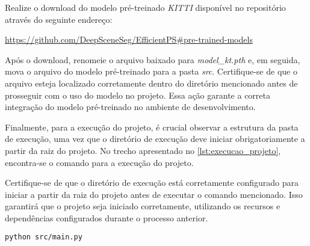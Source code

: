 Realize o download do modelo pré-treinado \emph{KITTI} disponível no repositório através do seguinte endereço:

\url{https://github.com/DeepSceneSeg/EfficientPS#pre-trained-models}

Após o download, renomeie o arquivo baixado para \emph{model\_kt.pth} e, em seguida, mova o arquivo do modelo pré-treinado para a pasta \emph{src}. Certifique-se de que o arquivo esteja localizado corretamente dentro do diretório mencionado antes de prosseguir com o uso do modelo no projeto. Essa ação garante a correta integração do modelo pré-treinado no ambiente de desenvolvimento.

Finalmente, para a execução do projeto, é crucial observar a estrutura da pasta de execução, uma vez que o diretório de execução deve iniciar obrigatoriamente a partir da raiz do projeto. No trecho apresentado no \cref{lst:execucao_projeto}, encontra-se o comando para a execução do projeto.

Certifique-se de que o diretório de execução está corretamente configurado para iniciar a partir da raiz do projeto antes de executar o comando mencionado. Isso garantirá que o projeto seja iniciado corretamente, utilizando os recursos e dependências configurados durante o processo anterior.

\begin{lstlisting}[caption={Trecho de código com comando para execução do projeto},label={lst:execucao_projeto},language=Bash,showstringspaces=false]
    python src/main.py
\end{lstlisting}
